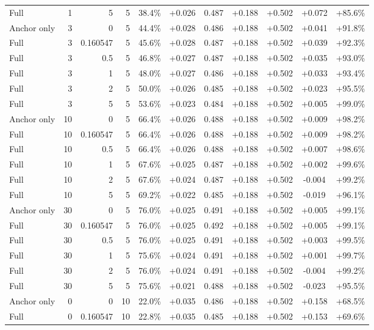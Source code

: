 \begin{table}[htbp]
\begin{tabular}{lrrrccccccc}
Full & 1 & 5 & 5 & 38.4\% & +0.026 & 0.487 & +0.188 & +0.502 & +0.072 & +85.6\% \\
Anchor only & 3 & 0 & 5 & 44.4\% & +0.028 & 0.486 & +0.188 & +0.502 & +0.041 & +91.8\% \\
Full & 3 & 0.160547 & 5 & 45.6\% & +0.028 & 0.487 & +0.188 & +0.502 & +0.039 & +92.3\% \\
Full & 3 & 0.5 & 5 & 46.8\% & +0.027 & 0.487 & +0.188 & +0.502 & +0.035 & +93.0\% \\
Full & 3 & 1 & 5 & 48.0\% & +0.027 & 0.486 & +0.188 & +0.502 & +0.033 & +93.4\% \\
Full & 3 & 2 & 5 & 50.0\% & +0.026 & 0.485 & +0.188 & +0.502 & +0.023 & +95.5\% \\
Full & 3 & 5 & 5 & 53.6\% & +0.023 & 0.484 & +0.188 & +0.502 & +0.005 & +99.0\% \\
Anchor only & 10 & 0 & 5 & 66.4\% & +0.026 & 0.488 & +0.188 & +0.502 & +0.009 & +98.2\% \\
Full & 10 & 0.160547 & 5 & 66.4\% & +0.026 & 0.488 & +0.188 & +0.502 & +0.009 & +98.2\% \\
Full & 10 & 0.5 & 5 & 66.4\% & +0.026 & 0.488 & +0.188 & +0.502 & +0.007 & +98.6\% \\
Full & 10 & 1 & 5 & 67.6\% & +0.025 & 0.487 & +0.188 & +0.502 & +0.002 & +99.6\% \\
Full & 10 & 2 & 5 & 67.6\% & +0.024 & 0.487 & +0.188 & +0.502 & -0.004 & +99.2\% \\
Full & 10 & 5 & 5 & 69.2\% & +0.022 & 0.485 & +0.188 & +0.502 & -0.019 & +96.1\% \\
Anchor only & 30 & 0 & 5 & 76.0\% & +0.025 & 0.491 & +0.188 & +0.502 & +0.005 & +99.1\% \\
Full & 30 & 0.160547 & 5 & 76.0\% & +0.025 & 0.492 & +0.188 & +0.502 & +0.005 & +99.1\% \\
Full & 30 & 0.5 & 5 & 76.0\% & +0.025 & 0.491 & +0.188 & +0.502 & +0.003 & +99.5\% \\
Full & 30 & 1 & 5 & 75.6\% & +0.024 & 0.491 & +0.188 & +0.502 & +0.001 & +99.7\% \\
Full & 30 & 2 & 5 & 76.0\% & +0.024 & 0.491 & +0.188 & +0.502 & -0.004 & +99.2\% \\
Full & 30 & 5 & 5 & 75.6\% & +0.021 & 0.488 & +0.188 & +0.502 & -0.023 & +95.5\% \\
Anchor only & 0 & 0 & 10 & 22.0\% & +0.035 & 0.486 & +0.188 & +0.502 & +0.158 & +68.5\% \\
Full & 0 & 0.160547 & 10 & 22.8\% & +0.035 & 0.485 & +0.188 & +0.502 & +0.153 & +69.6\% \\

\end{tabular}
\end{table}
